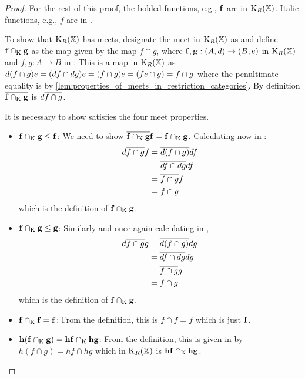 \begin{proof}
  For the rest of this proof, the bolded functions, e.g., $\mathbf{f}$ are in $\text{K}_{R}(\mathbb{X})$.
  Italic functions, e.g., $f$ are in \X.

  To show that $\text{K}_{R}(\mathbb{X})$ has meets,  designate the meet in $\text{K}_{R}(\mathbb{X})$ as \capspl
  and define $\mathbf{f} \cap_{\text{K}} \mathbf{g}$ as the map given by the \X map $f \cap g$, where
  $\mathbf{f},\mathbf{g}:(A,d)\to(B,e)$ in $\text{K}_{R}(\mathbb{X})$ and $f,g:A\to B$ in \X . This is
  a map in $\text{K}_{R}(\mathbb{X})$ as
  $d(f \cap g)e = (d\hspace{0.1pt} f \cap d\hspace{0.1pt} g) e = (f \cap g) e = (f e \cap g) = f\cap g$
  where the penultimate equality is by 
  \vref{lem:properties_of_meets_in_restriction_categories}. 
  By definition $\overline{\mathbf{f} \cap_{\text{K}} \mathbf{g} }$ is $d\overline{f\cap g}$.

  It is necessary to show \capspl satisfies the four meet properties.
  \begin{itemize}
    \item{$\mathbf{f}\cap_{\text{K}} \mathbf{g} \le \mathbf{f}$: } We need to show
      $\overline{\mathbf{f} \cap_{\text{K}} \mathbf{g}} \mathbf{f} =  \mathbf{f} \cap_{\text{K}} \mathbf{g}$.  Calculating now in \X:
      \begin{align*}
        d \overline{f \cap g} f&= \overline{d(f\cap g)} d f\\
        & = \overline{df \cap dg} df \\
        & = \overline{f \cap g} f \\
        & = f \cap g
      \end{align*}
      which is the definition of $\mathbf{f} \cap_{\text{K}} \mathbf{g}$.
    \item{$\mathbf{f}\cap_{\text{K}} \mathbf{g} \le \mathbf{g}$: } Similarly and once again calculating in \X,
      \begin{align*}
        d \overline{f \cap g} g&= \overline{d(f\cap g)} d g\\
        & = \overline{df \cap dg} dg \\
        & = \overline{f \cap g} g \\
        & = f \cap g
      \end{align*}
      which is the definition of $\mathbf{f} \cap_{\text{K}} \mathbf{g}$.
    \item{$\mathbf{f}\cap_{\text{K}} \mathbf{f} = \mathbf{f}$: } From the definition, this is $f \cap f = f$ which
      is just $ \mathbf{f}$.
    \item{$\mathbf{h}(\mathbf{f}\cap_{\text{K}} \mathbf{g}) = \mathbf{h}\mathbf{f} \cap_{\text{K}} \mathbf{h}\mathbf{g}$: }
      From the definition, this is given in \X by $ h (f \cap g) =
      h f \cap h g$ which in $\text{K}_{R}(\mathbb{X})$ is $\mathbf{h}\mathbf{f} \cap_{\text{K}} \mathbf{h}\mathbf{g}$.
  \end{itemize}
\end{proof}



